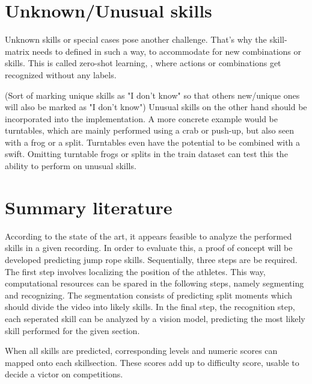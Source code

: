 \section{Unknown/Unusual skills}
\label{subsec:bp-literature-unknowmultin-unusual-skills}

Unknown skills or special cases pose another challenge. That's why the skill-matrix needs to defined in such a way, to accommodate for new combinations or skills. This is called zero-shot learning, \autocite{Pourpanah_2022}, where actions or combinations get recognized without any labels.

(Sort of marking unique skills as "I don't know" so that others new/unique ones will also be marked as "I don't know") Unusual skills on the other hand should be incorporated into the implementation.
A more concrete example would be turntables, which are mainly performed using a crab or push-up, but also seen with a frog or a split.
Turntables even have the potential to be combined with a swift. Omitting turntable frogs or splits in the train dataset can test this the ability to perform on unusual skills.




\section{Summary literature}
\label{subsec:bp-summary literature}

According to the state of the art, it appears feasible to analyze the performed skills in a given recording. In order to evaluate this, a proof of concept will be developed predicting jump rope skills. Sequentially, three steps are be required. The first step involves localizing the position of the athletes. This way, computational resources can be spared in the following steps, namely segmenting and recognizing. The segmentation consists of predicting split moments which should divide the video into likely skills. In the final step, the recognition step, each seperated skill can be analyzed by a vision model, predicting the most likely skill performed for the given section.

When all skills are predicted, corresponding levels and numeric scores can mapped onto each skillsection. These scores add up to difficulty score, usable to decide a victor on competitions.
